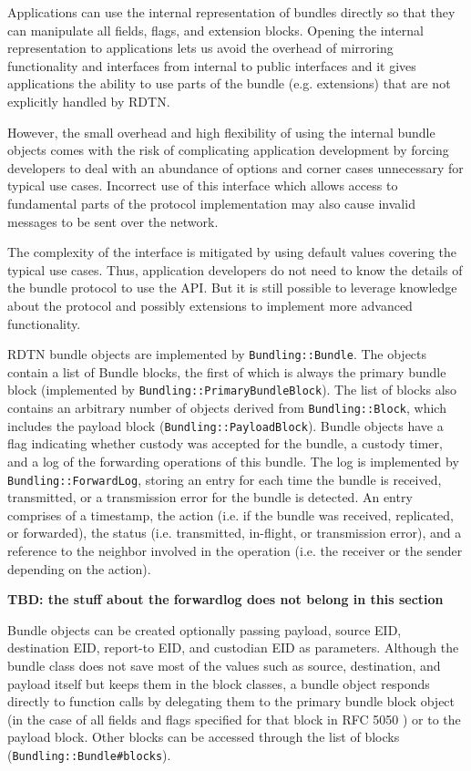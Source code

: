 \documentclass{article}
\begin{document}
Applications can use the internal representation of bundles directly so that
they can manipulate all fields, flags, and extension blocks. Opening the
internal representation to applications lets us avoid the overhead of mirroring
functionality and interfaces from internal to public interfaces and it gives
applications the ability to use parts of the bundle (e.g. extensions) that are
not explicitly handled by RDTN.

However, the small overhead and high flexibility of using the internal bundle
objects comes with the risk of complicating application development by forcing
developers to deal with an abundance of options and corner cases unnecessary for
typical use cases. Incorrect use of this interface which allows access to
fundamental parts of the protocol implementation may also cause invalid messages
to be sent over the network.

The complexity of the interface is mitigated by using default values covering the
typical use cases. Thus, application developers do not need to know the details
of the bundle protocol to use the API. But it is still possible to leverage
knowledge about the protocol and possibly extensions to implement more advanced
functionality.

RDTN bundle objects are implemented by {\tt Bundling::Bundle}. The objects
contain a list of Bundle blocks, the first of which is always the primary bundle
block (implemented by {\tt Bundling::PrimaryBundleBlock}). The list of blocks
also contains an arbitrary number of objects derived from {\tt Bundling::Block},
which includes the payload block ({\tt Bundling::PayloadBlock}). Bundle objects
have a flag indicating whether custody was accepted for the bundle, a custody
timer, and a log of the forwarding operations of this bundle. The log is
implemented by {\tt Bundling::ForwardLog}, storing an entry for each time the
bundle is received, transmitted, or a transmission error for the bundle is
detected. An entry comprises of a timestamp, the action (i.e. if the bundle was
received, replicated, or forwarded), the status (i.e. transmitted, in-flight, or
transmission error), and a reference to the neighbor involved in the operation
(i.e. the receiver or the sender depending on the action).

{\bf TBD: the stuff about the forwardlog does not belong in this section}

Bundle objects can be created optionally passing payload, source EID,
destination EID, report-to EID, and custodian EID as parameters. Although the
bundle class does not save most of the values such as source, destination, and
payload itself but keeps them in the block classes, a bundle object responds
directly to function calls by delegating them to the primary bundle block object
(in the case of all fields and flags specified for that block in RFC 5050
\cite{bundle-spec}) or to the payload block. Other blocks can be accessed
through the list of blocks ({\tt Bundling::Bundle\#blocks}).
\end{document}
